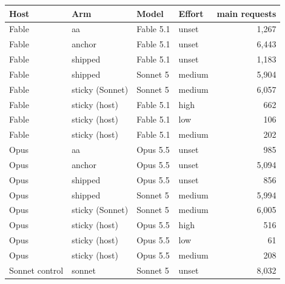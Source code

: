 \begin{tabular*}{\textwidth}{@{\extracolsep{\fill}}l l l l r@{}}
\toprule
Host & Arm & Model & Effort & main requests \\
\midrule
Fable & aa & Fable 5.1 & unset & 1{,}267 \\
Fable & anchor & Fable 5.1 & unset & 6{,}443 \\
Fable & shipped & Fable 5.1 & unset & 1{,}183 \\
Fable & shipped & Sonnet 5 & medium & 5{,}904 \\
Fable & sticky (Sonnet) & Sonnet 5 & medium & 6{,}057 \\
Fable & sticky (host) & Fable 5.1 & high & 662 \\
Fable & sticky (host) & Fable 5.1 & low & 106 \\
Fable & sticky (host) & Fable 5.1 & medium & 202 \\
Opus & aa & Opus 5.5 & unset & 985 \\
Opus & anchor & Opus 5.5 & unset & 5{,}094 \\
Opus & shipped & Opus 5.5 & unset & 856 \\
Opus & shipped & Sonnet 5 & medium & 5{,}994 \\
Opus & sticky (Sonnet) & Sonnet 5 & medium & 6{,}005 \\
Opus & sticky (host) & Opus 5.5 & high & 516 \\
Opus & sticky (host) & Opus 5.5 & low & 61 \\
Opus & sticky (host) & Opus 5.5 & medium & 208 \\
Sonnet control & sonnet & Sonnet 5 & unset & 8{,}032 \\
\bottomrule
\end{tabular*}
